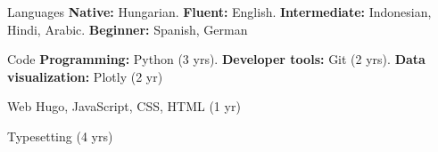 
\begin{cvskills}

  \cvskill
    {Languages} %
    {\textbf{Native:} Hungarian. \textbf{Fluent:} English. \textbf{Intermediate:} Indonesian, Hindi, Arabic. \textbf{Beginner:} Spanish, German} %
    
  \cvskill
    {Code} %
    {\textbf{Programming:} Python (3 yrs). \textbf{Developer tools:} Git (2 yrs). \textbf{Data visualization:} Plotly (2 yr)} %

  \cvskill
    {Web}
    {Hugo, JavaScript, CSS, HTML (1 yr)}
    
  \cvskill
    {Typesetting}
    {\textrm{} (4 yrs)}
  
\end{cvskills}
